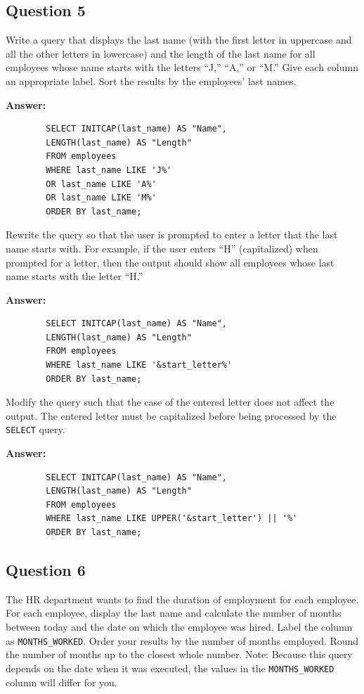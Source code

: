 \documentclass[12pt,a4paper]{article}
\begin{document}
\subsection*{Question 5}
Write a query that displays the last name (with the first letter in uppercase and all the other 
letters in lowercase) and the length of the last name for all employees whose name starts with 
the letters “J,” “A,” or “M.” Give each column an appropriate label. Sort the results by the 
employees’ last names.

\textbf{Answer:}
    \begin{lstlisting}
        SELECT INITCAP(last_name) AS "Name",
        LENGTH(last_name) AS "Length"
        FROM employees
        WHERE last_name LIKE 'J%'
        OR last_name LIKE 'A%'
        OR last_name LIKE 'M%'
        ORDER BY last_name;
    \end{lstlisting}

Rewrite the query so that the user is prompted to enter a letter that the last name starts with. For 
example, if the user enters “H” (capitalized) when prompted for a letter, then the output should 
show all employees whose last name starts with the letter “H.”

\textbf{Answer:}
    \begin{lstlisting}
        SELECT INITCAP(last_name) AS "Name",
        LENGTH(last_name) AS "Length"
        FROM employees
        WHERE last_name LIKE '&start_letter%'
        ORDER BY last_name;
    \end{lstlisting}

Modify the query such that the case of the entered letter does not affect the output. The entered 
letter must be capitalized before being processed by the \texttt{SELECT} query.

\textbf{Answer:}
    \begin{lstlisting}
        SELECT INITCAP(last_name) AS "Name",
        LENGTH(last_name) AS "Length"
        FROM employees
        WHERE last_name LIKE UPPER('&start_letter') || '%'
        ORDER BY last_name;
    \end{lstlisting}

\subsection*{Question 6}
The HR department wants to find the duration of employment for each employee. For each 
employee, display the last name and calculate the number of months between today and the 
date on which the employee was hired. Label the column as \texttt{MONTHS\_WORKED}. Order your 
results by the number of months employed. Round the number of months up to the closest 
whole number.
Note: Because this query depends on the date when it was executed, the values in the 
\texttt{MONTHS\_WORKED} column will differ for you.
\end{document}
